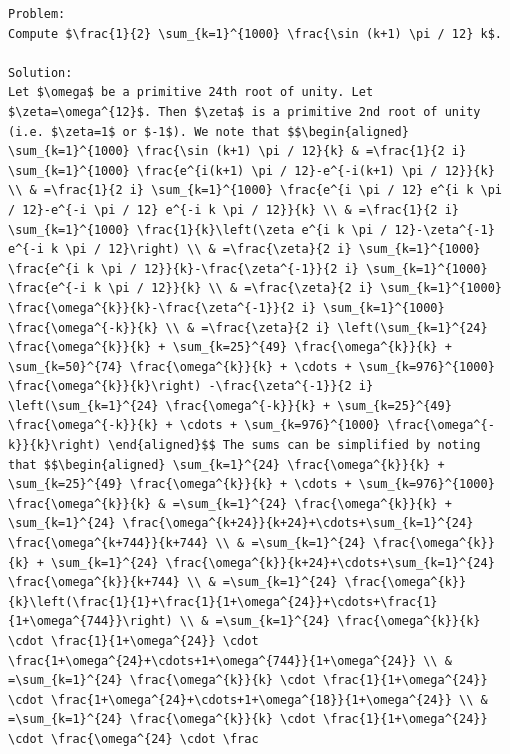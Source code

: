 \documentclass[11pt]{article}
\begin{document}
\begin{Verbatim}[breaklines=true,breakanywhere=true,fontsize=\small]
Problem:
Compute $\frac{1}{2} \sum_{k=1}^{1000} \frac{\sin (k+1) \pi / 12} k$.

Solution:
Let $\omega$ be a primitive 24th root of unity. Let $\zeta=\omega^{12}$. Then $\zeta$ is a primitive 2nd root of unity (i.e. $\zeta=1$ or $-1$). We note that $$\begin{aligned} \sum_{k=1}^{1000} \frac{\sin (k+1) \pi / 12}{k} & =\frac{1}{2 i} \sum_{k=1}^{1000} \frac{e^{i(k+1) \pi / 12}-e^{-i(k+1) \pi / 12}}{k} \\ & =\frac{1}{2 i} \sum_{k=1}^{1000} \frac{e^{i \pi / 12} e^{i k \pi / 12}-e^{-i \pi / 12} e^{-i k \pi / 12}}{k} \\ & =\frac{1}{2 i} \sum_{k=1}^{1000} \frac{1}{k}\left(\zeta e^{i k \pi / 12}-\zeta^{-1} e^{-i k \pi / 12}\right) \\ & =\frac{\zeta}{2 i} \sum_{k=1}^{1000} \frac{e^{i k \pi / 12}}{k}-\frac{\zeta^{-1}}{2 i} \sum_{k=1}^{1000} \frac{e^{-i k \pi / 12}}{k} \\ & =\frac{\zeta}{2 i} \sum_{k=1}^{1000} \frac{\omega^{k}}{k}-\frac{\zeta^{-1}}{2 i} \sum_{k=1}^{1000} \frac{\omega^{-k}}{k} \\ & =\frac{\zeta}{2 i} \left(\sum_{k=1}^{24} \frac{\omega^{k}}{k} + \sum_{k=25}^{49} \frac{\omega^{k}}{k} + \sum_{k=50}^{74} \frac{\omega^{k}}{k} + \cdots + \sum_{k=976}^{1000} \frac{\omega^{k}}{k}\right) -\frac{\zeta^{-1}}{2 i} \left(\sum_{k=1}^{24} \frac{\omega^{-k}}{k} + \sum_{k=25}^{49} \frac{\omega^{-k}}{k} + \cdots + \sum_{k=976}^{1000} \frac{\omega^{-k}}{k}\right) \end{aligned}$$ The sums can be simplified by noting that $$\begin{aligned} \sum_{k=1}^{24} \frac{\omega^{k}}{k} + \sum_{k=25}^{49} \frac{\omega^{k}}{k} + \cdots + \sum_{k=976}^{1000} \frac{\omega^{k}}{k} & =\sum_{k=1}^{24} \frac{\omega^{k}}{k} + \sum_{k=1}^{24} \frac{\omega^{k+24}}{k+24}+\cdots+\sum_{k=1}^{24} \frac{\omega^{k+744}}{k+744} \\ & =\sum_{k=1}^{24} \frac{\omega^{k}}{k} + \sum_{k=1}^{24} \frac{\omega^{k}}{k+24}+\cdots+\sum_{k=1}^{24} \frac{\omega^{k}}{k+744} \\ & =\sum_{k=1}^{24} \frac{\omega^{k}}{k}\left(\frac{1}{1}+\frac{1}{1+\omega^{24}}+\cdots+\frac{1}{1+\omega^{744}}\right) \\ & =\sum_{k=1}^{24} \frac{\omega^{k}}{k} \cdot \frac{1}{1+\omega^{24}} \cdot \frac{1+\omega^{24}+\cdots+1+\omega^{744}}{1+\omega^{24}} \\ & =\sum_{k=1}^{24} \frac{\omega^{k}}{k} \cdot \frac{1}{1+\omega^{24}} \cdot \frac{1+\omega^{24}+\cdots+1+\omega^{18}}{1+\omega^{24}} \\ & =\sum_{k=1}^{24} \frac{\omega^{k}}{k} \cdot \frac{1}{1+\omega^{24}} \cdot \frac{\omega^{24} \cdot \frac
\end{Verbatim}
\clearpage
\end{document}
